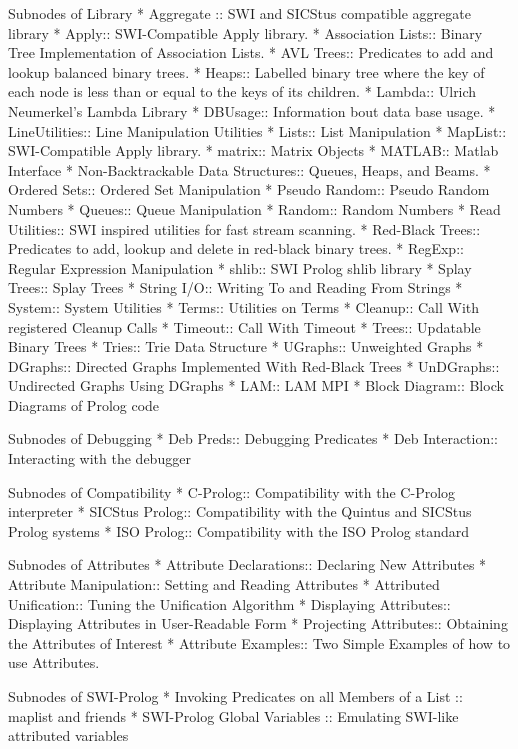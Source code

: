 Subnodes of Library
* Aggregate :: SWI and SICStus compatible aggregate library
* Apply:: SWI-Compatible Apply library.
* Association Lists:: Binary Tree Implementation of Association Lists.
* AVL Trees:: Predicates to add and lookup balanced binary  trees.
* Heaps:: Labelled binary tree where the key of each node is less
    than or equal to the keys of its children.
* Lambda:: Ulrich Neumerkel's Lambda Library
* DBUsage:: Information bout data base usage.
* LineUtilities:: Line Manipulation Utilities
* Lists:: List Manipulation
* MapList:: SWI-Compatible Apply library.
* matrix:: Matrix Objects
* MATLAB:: Matlab Interface
* Non-Backtrackable Data Structures:: Queues, Heaps, and Beams.
* Ordered Sets:: Ordered Set Manipulation
* Pseudo Random:: Pseudo Random Numbers
* Queues:: Queue Manipulation
* Random:: Random Numbers
* Read Utilities:: SWI inspired utilities for fast stream scanning.
* Red-Black Trees:: Predicates to add, lookup and delete in red-black binary  trees.
* RegExp:: Regular Expression Manipulation
* shlib:: SWI Prolog shlib library
* Splay Trees:: Splay Trees
* String I/O:: Writing To and Reading From Strings
* System:: System Utilities
* Terms:: Utilities on Terms
* Cleanup:: Call With registered Cleanup Calls
* Timeout:: Call With Timeout
* Trees:: Updatable Binary Trees
* Tries:: Trie Data Structure
* UGraphs:: Unweighted Graphs
* DGraphs:: Directed Graphs Implemented With Red-Black Trees
* UnDGraphs:: Undirected Graphs Using DGraphs
* LAM:: LAM MPI
* Block Diagram:: Block Diagrams of Prolog code


Subnodes of Debugging
* Deb Preds:: Debugging Predicates
* Deb Interaction:: Interacting with the debugger

Subnodes of Compatibility
* C-Prolog:: Compatibility with the C-Prolog interpreter
* SICStus Prolog:: Compatibility with the Quintus and SICStus Prolog systems
* ISO Prolog::  Compatibility with the ISO Prolog standard

Subnodes of Attributes
* Attribute Declarations:: Declaring New Attributes
* Attribute Manipulation:: Setting and Reading Attributes
* Attributed Unification:: Tuning the Unification Algorithm
* Displaying Attributes:: Displaying Attributes in User-Readable Form
* Projecting Attributes:: Obtaining the Attributes of Interest
* Attribute Examples:: Two Simple Examples of how to use Attributes.

Subnodes of SWI-Prolog
* Invoking Predicates on all Members of a List :: maplist and friends
* SWI-Prolog Global Variables :: Emulating SWI-like attributed variables

